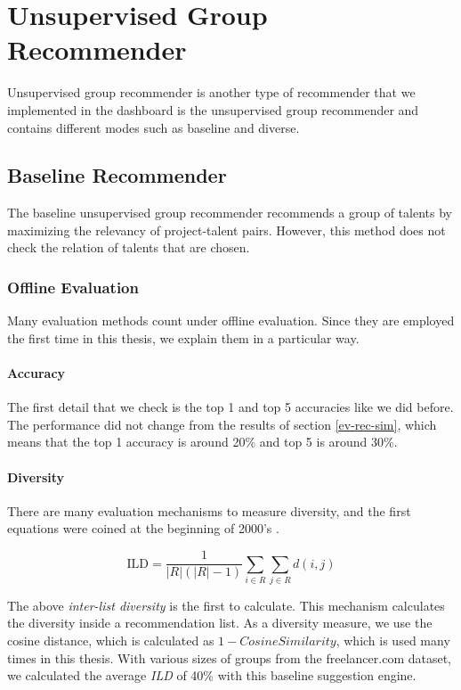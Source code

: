 \section{Unsupervised Group Recommender}\label{ev:unsupervised-group-rec}

Unsupervised group recommender is another type of recommender that we implemented in the dashboard is the unsupervised group recommender and contains different modes such as baseline and diverse. 

\subsection{Baseline Recommender}

The baseline unsupervised group recommender recommends a group of talents by maximizing the relevancy of project-talent pairs. However, this method does not check the relation of talents that are chosen. 

\subsubsection{Offline Evaluation}

Many evaluation methods count under offline evaluation. Since they are employed the first time in this thesis, we explain them in a particular way.

\paragraph{Accuracy}

The first detail that we check is the top 1 and top 5 accuracies like we did before. The performance did not change from the results of section \ref{ev-rec-sim}, which means that the top 1 accuracy is around 20\% and top 5 is around 30\%.

\paragraph{Diversity}\label{ev-unsupervised-group-diversity}

There are many evaluation mechanisms to measure diversity, and the first equations were coined at the beginning of 2000's \cite{smyth2001similarity}.

$$\mathrm { ILD } = \frac { 1 } { | R | ( | R | - 1 ) } \sum _ { i \in R } \sum _ { j \in R } d ( i , j )$$

The above \textit{inter-list diversity} is the first to calculate. This mechanism calculates the diversity inside a recommendation list. As a diversity measure, we use the cosine distance, which is calculated as $1 - Cosine Similarity$, which is used many times in this thesis. With various sizes of groups from the freelancer.com dataset, we calculated the average \textit{ILD} of 40\% with this baseline suggestion engine.

